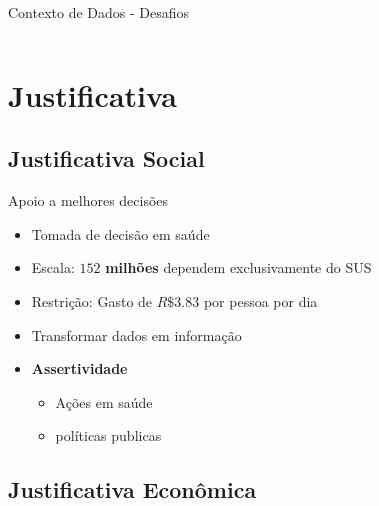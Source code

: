 \documentclass[10pt,brazil]{beamer}
\theoremstyle{definition}
\begin{document}
\begin{frame}{Contexto de Dados - Desafios}
\begin{columns}
\begin{column}{0.5\textwidth}
      \end{column}
  \end{columns}
\end{frame}


\section{Justificativa}

\subsection{Justificativa Social}

\begin{frame}{Apoio a melhores decisões}

      \begin{itemize}
            \item Tomada de decisão em saúde
            \item Escala: $152$ \textbf{milhões} dependem exclusivamente do SUS
            \item Restrição: Gasto de $R\$3.83$ por pessoa por dia
            \item Transformar dados em informação
            \item \textbf{Assertividade}
      \begin{itemize}
          \item Ações em saúde
          \item políticas publicas
      \end{itemize}
      \end{itemize}
 
\end{frame}

\subsection{Justificativa Econômica}
\end{document}
